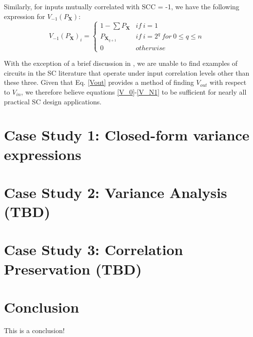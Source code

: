 \documentclass[conference]{IEEEtran}
\begin{document}
Similarly, for inputs mutually correlated with SCC = -1, we have the following expression for $V_{-1}(P_{\mathbf{X}})$:
\begin{equation}\label{V_N1}
    V_{-1}(P_{\mathbf{X}})_i =
    \begin{cases}
        1 - \sum P_{\mathbf{X}} & if \ i = 1\\
        P_{\mathbf{X}_{q+1}} & if \ i = 2^q \ for \ 0 \leq q \leq n\\
        0 & otherwise
    \end{cases}
\end{equation}

With the exception of a brief discussion in \cite{EXPLOITING_CORR}, we are unable to find examples of circuits in the SC literature that operate under input correlation levels other than these three. Given that Eq. \ref{Vout} provides a method of finding $V_{out}$ with respect to $V_{in}$, we therefore believe equations \ref{V_0}-\ref{V_N1} to be sufficient for nearly all practical SC design applications.

\section{Case Study 1: Closed-form variance expressions}

\section{Case Study 2: Variance Analysis (TBD)}

\section{Case Study 3: Correlation Preservation (TBD)}

\section{Conclusion}
This is a conclusion!
\end{document}
